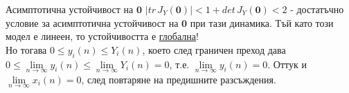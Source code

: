   \begin{frame}[t]{Асимптотична устойчивост на $\mathbf{0}$}
    $\lvert tr \, J_{Y}(\mathbf{0}) \rvert < 1 + det \, J_{Y}(\mathbf{0}) < 2$ - достатъчно условие за асимптотична устойчивост на $\mathbf{0}$ при тази динамика. Тъй като този модел е линеен, то устойчивостта е \underline{глобална}! \\
    Но тогава $0 \leq y_{i}(n) \leq Y_{i}(n)$, което след граничен преход дава $0 \leq \lim\limits_{n \to \infty}y_{i}(n) \leq \lim\limits_{n \to \infty}Y_{i}(n)=0$, т.е. $\lim\limits_{n \to \infty}y_{i}(n)=0$. Оттук и $\lim\limits_{n \to \infty}x_{i}(n)=0$, след повтаряне на предишните разсъждения.

  \end{frame}

